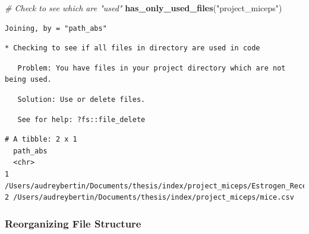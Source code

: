 \documentclass[12pt,twoside]{reedthesis}
\newenvironment{Shaded}{\begin{snugshade}}{\end{snugshade}}
\newcommand{\KeywordTok}[1]{\textcolor[rgb]{0.13,0.29,0.53}{\textbf{#1}}}
\newcommand{\StringTok}[1]{\textcolor[rgb]{0.31,0.60,0.02}{#1}}
\newcommand{\CommentTok}[1]{\textcolor[rgb]{0.56,0.35,0.01}{\textit{#1}}}
\newcommand{\NormalTok}[1]{#1}
\begin{document}
\begin{Shaded}
\begin{Highlighting}[]
\CommentTok{# Check to see which are "used"}
\KeywordTok{has_only_used_files}\NormalTok{(}\StringTok{"project_miceps"}\NormalTok{)}
\end{Highlighting}
\end{Shaded}
\begin{verbatim}
Joining, by = "path_abs"
\end{verbatim}
\begin{verbatim}
* Checking to see if all files in directory are used in code
\end{verbatim}
\begin{verbatim}
   Problem: You have files in your project directory which are not being used.
\end{verbatim}
\begin{verbatim}
   Solution: Use or delete files.
\end{verbatim}
\begin{verbatim}
   See for help: ?fs::file_delete
\end{verbatim}
\begin{verbatim}
# A tibble: 2 x 1
  path_abs                                                                      
  <chr>                                                                         
1 /Users/audreybertin/Documents/thesis/index/project_miceps/Estrogen_Receptors.~
2 /Users/audreybertin/Documents/thesis/index/project_miceps/mice.csv            
\end{verbatim}
\subsubsection{Reorganizing File
Structure}\label{reorganizing-file-structure}
\end{document}
